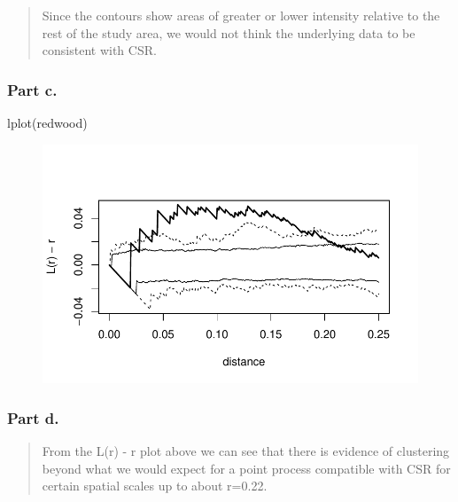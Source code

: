 \documentclass[
  letterpaper,
  DIV=11,
  numbers=noendperiod]{scrartcl}
\newenvironment{Shaded}{\begin{snugshade}}{\end{snugshade}}
\newcommand{\FunctionTok}[1]{\textcolor[rgb]{0.28,0.35,0.67}{#1}}
\newcommand{\NormalTok}[1]{\textcolor[rgb]{0.00,0.23,0.31}{#1}}
\begin{document}
\begin{quote}
Since the contours show areas of greater or lower intensity relative to
the rest of the study area, we would not think the underlying data to be
consistent with CSR.
\end{quote}

\hypertarget{part-c.-1}{%
\subsubsection{Part c.}\label{part-c.-1}}

\begin{Shaded}
\begin{Highlighting}[]
\FunctionTok{lplot}\NormalTok{(redwood)}
\end{Highlighting}
\end{Shaded}

\begin{figure}[H]

{\centering \includegraphics{robby_homework_2_files/figure-pdf/unnamed-chunk-7-1.pdf}

}

\end{figure}

\hypertarget{part-d.}{%
\subsubsection{Part d.}\label{part-d.}}

\begin{quote}
From the L(r) - r plot above we can see that there is evidence of
clustering beyond what we would expect for a point process compatible
with CSR for certain spatial scales up to about r=0.22.
\end{quote}
\end{document}
